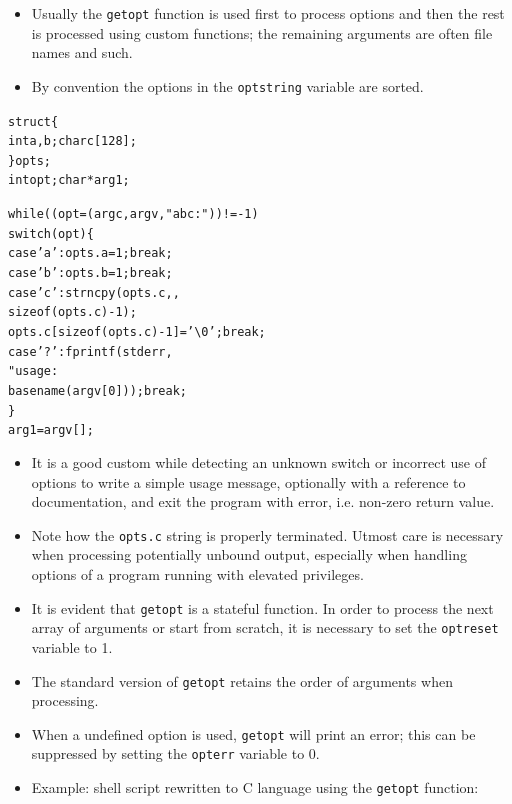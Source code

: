 \begin{itemize}
\item Usually the \texttt{getopt} function is used first to process options
and then the rest is processed using custom functions; the remaining arguments
are often file names and such.
\item By convention the options in the \texttt{optstring} variable are sorted.
\end{itemize}


\begin{slide}
\setlength{\baselineskip}{0.8\baselineskip}
\begin{alltt}
struct \{
    int a, b; char c[128]; 
\} opts; 
int opt; char *arg1; 

while((opt = (argc, argv, "abc:")) != -1) 
    switch(opt) \{ 
        case 'a': opts.a = 1; break; 
        case 'b': opts.b = 1; break; 
        case 'c': strncpy(opts.c, ,
            sizeof (opts.c) - 1);
            opts.c[sizeof (opts.c) - 1] = '\textbackslash0'; break; 
        case '?': fprintf(stderr, 
            "usage: %
            basename(argv[0])); break; 
    \} 
arg1 = argv[];
\end{alltt}
\end{slide}

\begin{itemize}
\item It is a good custom while detecting an unknown switch or incorrect use
of options to write a simple usage message, optionally with a reference to documentation,
and exit the program with error, i.e. non-zero return value.
\item Note how the \texttt{opts.c} string is properly terminated. Utmost care
is necessary when processing potentially unbound output, especially when
handling options of a program running with elevated privileges.
\item It is evident that \texttt{getopt} is a stateful function. In order to
process the next array of arguments or start from scratch, it is necessary to
set the \texttt{optreset} variable to 1.
\item The standard version of \texttt{getopt} retains the order of arguments when
processing.
\item When a undefined option is used, \texttt{getopt} will print an error;
this can be suppressed by setting the \texttt{opterr} variable to 0.
\item \label{GETOPT} Example: shell script 
rewritten to C language using the \texttt{getopt} function:
\end{itemize}

